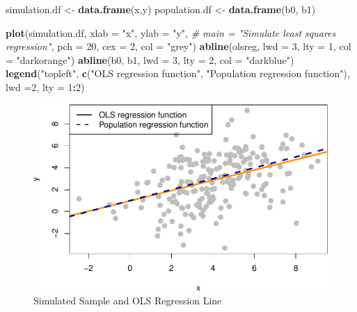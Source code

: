 \documentclass[]{book}
\newenvironment{Shaded}{\begin{snugshade}}{\end{snugshade}}
\newcommand{\CommentTok}[1]{\textcolor[rgb]{0.56,0.35,0.01}{\textit{#1}}}
\newcommand{\DataTypeTok}[1]{\textcolor[rgb]{0.13,0.29,0.53}{#1}}
\newcommand{\DecValTok}[1]{\textcolor[rgb]{0.00,0.00,0.81}{#1}}
\newcommand{\KeywordTok}[1]{\textcolor[rgb]{0.13,0.29,0.53}{\textbf{#1}}}
\newcommand{\NormalTok}[1]{#1}
\newcommand{\OperatorTok}[1]{\textcolor[rgb]{0.81,0.36,0.00}{\textbf{#1}}}
\newcommand{\StringTok}[1]{\textcolor[rgb]{0.31,0.60,0.02}{#1}}
\begin{document}
\begin{Shaded}
\begin{Highlighting}[]
\NormalTok{simulation.df <-}\StringTok{ }\KeywordTok{data.frame}\NormalTok{(x,y)}
\NormalTok{population.df <-}\StringTok{ }\KeywordTok{data.frame}\NormalTok{(b0, b1)}
\end{Highlighting}
\end{Shaded}

\begin{Shaded}
\begin{Highlighting}[]
\KeywordTok{plot}\NormalTok{(simulation.df, }
     \DataTypeTok{xlab =} \StringTok{"x"}\NormalTok{,}
     \DataTypeTok{ylab =} \StringTok{"y"}\NormalTok{,}
     \CommentTok{# main = "Simulate least squares regression",}
     \DataTypeTok{pch  =} \DecValTok{20}\NormalTok{,}
     \DataTypeTok{cex  =} \DecValTok{2}\NormalTok{,}
     \DataTypeTok{col  =} \StringTok{"grey"}\NormalTok{)}
\KeywordTok{abline}\NormalTok{(olsreg, }\DataTypeTok{lwd =} \DecValTok{3}\NormalTok{, }\DataTypeTok{lty =} \DecValTok{1}\NormalTok{, }\DataTypeTok{col =} \StringTok{"darkorange"}\NormalTok{)}
\KeywordTok{abline}\NormalTok{(b0, b1,  }\DataTypeTok{lwd =} \DecValTok{3}\NormalTok{,  }\DataTypeTok{lty =} \DecValTok{2}\NormalTok{,   }\DataTypeTok{col =} \StringTok{"darkblue"}\NormalTok{)}
\KeywordTok{legend}\NormalTok{(}\StringTok{"topleft"}\NormalTok{, }
       \KeywordTok{c}\NormalTok{(}\StringTok{"OLS regression function"}\NormalTok{, }
         \StringTok{"Population regression function"}\NormalTok{), }
       \DataTypeTok{lwd =}\DecValTok{2}\NormalTok{, }
       \DataTypeTok{lty =} \DecValTok{1}\OperatorTok{:}\DecValTok{2}\NormalTok{)}
\end{Highlighting}
\end{Shaded}

\begin{figure}

{\centering \includegraphics[width=0.8\linewidth]{MEM5220_R_files/figure-latex/fig5-1} 

}

\caption{Simulated Sample and OLS Regression Line}\label{fig:fig5}
\end{figure}
\end{document}

